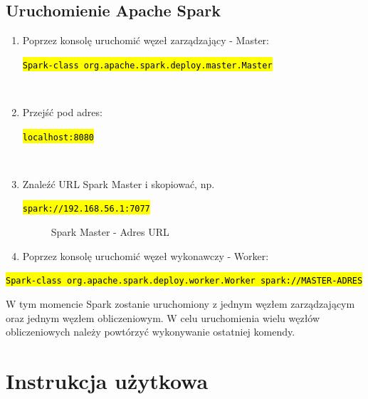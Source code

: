 \documentclass[a4paper,onecolumn,oneside,12pt]{memoir}
\begin{document}
{\begin{itemize}
\begin{framed}
\begin{enumerate}[labelwidth=\widthof{\ref{last-item}},label=\arabic*.]
\end{enumerate}
\end{framed}

\end{itemize}
\pagebreak
\vspace*{1mm}
\section{Uruchomienie Apache Spark}

\begin{enumerate}
\item Poprzez konsolę uruchomić węzeł zarządzający - Master:  \\
\centerline{\texttt{\hl{Spark-class org.apache.spark.deploy.master.Master}}}
\\
\item Przejść pod adres: \\
\centerline{\texttt{\hl{localhost:8080}}}
\\
\item Znaleźć URL Spark Master i skopiować, np. \\  
\centerline{\texttt{\hl{spark://192.168.56.1:7077}}}
\begin{figure}[h]
	\centering
	\caption{Spark Master - Adres URL}
	\label{fig:stronaTytulowa}
\end{figure}

\item Poprzez konsolę uruchomić węzeł wykonawczy - Worker:
\end{enumerate}
\centerline{\texttt{\hl{Spark-class org.apache.spark.deploy.worker.Worker spark://MASTER-ADRES}}}
\vspace*{4mm}
W tym momencie Spark zostanie uruchomiony z jednym węzłem zarządzającym oraz jednym węzłem obliczeniowym. W celu uruchomienia wielu węzłów obliczeniowych należy powtórzyć wykonywanie ostatniej komendy.


\chapter{Instrukcja użytkowa}


}
\end{document}
